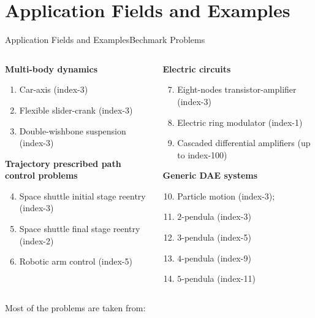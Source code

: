
\section{Application Fields and Examples}

\begin{frame}{Application Fields and Examples}{Bechmark Problems}
  \begin{columns}
    \begin{column}[t]{0.575\textwidth}
      \textbf{Multi-body dynamics}
      \begin{enumerate}\small
        \setlength{\itemsep}{0.0em}
        \item Car-axis (index-3)
        \item Flexible slider-crank (index-3)
        \item Double-wishbone suspension (index-3)
      \end{enumerate}
      \textbf{Trajectory prescribed path control problems}
      \begin{enumerate}\setcounter{enumi}{3}\small
        \setlength{\itemsep}{0.0em}
        \item Space shuttle initial stage reentry (index-3)
        \item Space shuttle final stage reentry (index-2)
        \item Robotic arm control  (index-5)
      \end{enumerate}
    \end{column}
    \hspace{-0.055\textwidth}
    \begin{column}[t]{0.55\textwidth}
      \textbf{Electric circuits}
      \begin{enumerate}\setcounter{enumi}{6}\small
        \setlength{\itemsep}{0.0em}
        \item Eight-nodes transistor-amplifier (index-3)
        \item Electric ring modulator (index-1)
        \item Cascaded differential amplifiers (up to index-100)
      \end{enumerate}
      \textbf{Generic \acs{DAE} systems}
      \begin{enumerate}\setcounter{enumi}{9}\small
        \setlength{\itemsep}{0.0em}
        \item Particle motion (index-3);
        \item $2$-pendula (index-3)
        \item $3$-pendula (index-5)
        \item $4$-pendula (index-9)
        \item $5$-pendula (index-11)
      \end{enumerate}
    \end{column}
  \end{columns}
  \vspace{1.0em}
  \scriptsize{Most of the problems are taken from: \\
   \\
  }
\end{frame}

